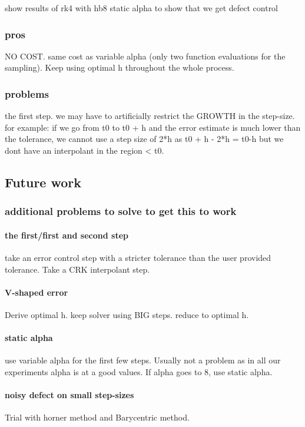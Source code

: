 \documentclass{article}
\begin{document}
show results of rk4 with hb8 static alpha to show that we get defect control
	
\subsubsection{pros}
NO COST. same cost as variable alpha (only two function evaluations for the sampling). Keep using optimal h throughout the whole process.

\subsubsection{problems}
the first step. we may have to artificially restrict the GROWTH in the step-size.
for example:
if we go from t0 to t0 + h and the error estimate is much lower than the tolerance, we cannot use a step size of 2*h as t0 + h - 2*h = t0-h but we dont have an interpolant in the region < t0.

\subsection{Future work}
\subsubsection{additional problems to solve to get this to work}
\paragraph{the first/first and second step}
take an error control step with a stricter tolerance than the user provided tolerance. 
Take a CRK interpolant step.

\paragraph{V-shaped error}
Derive optimal h. keep solver using BIG steps. reduce to optimal h.

\paragraph{static alpha}
use variable alpha for the first few steps. Usually not a problem as in all our experiments alpha is at a good values.
If alpha goes to 8, use static alpha.

\paragraph{noisy defect on small step-sizes}
Trial with horner method and Barycentric method.
\end{document}
